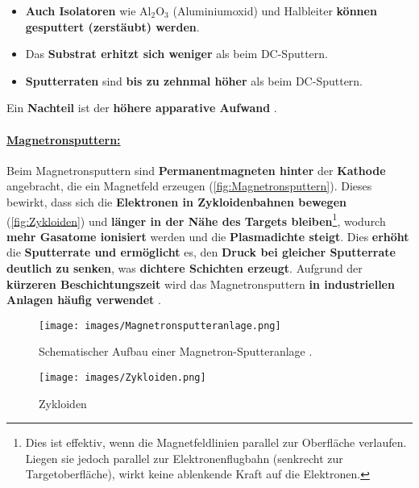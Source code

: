 \documentclass{article} %
\begin{document}
\begin{itemize}
    \item \textbf{Auch Isolatoren} wie \( \mathrm{Al}_2\mathrm{O}_3 \) (Aluminiumoxid) und Halbleiter \textbf{können gesputtert (zerstäubt) werden}.
    \item Das \textbf{Substrat erhitzt sich weniger} als beim DC-Sputtern.
    \item \textbf{Sputterraten} sind \textbf{bis zu zehnmal höher} als beim DC-Sputtern.
\end{itemize}

Ein \textbf{Nachteil} ist der \textbf{höhere apparative Aufwand} \cite{keplinger2024}.

\vspace{0.0em}

\paragraph{\uline{Magnetronsputtern:}} Beim Magnetronsputtern sind \textbf{Permanentmagneten hinter} der \textbf{Kathode} angebracht, die ein Magnetfeld erzeugen (\autoref{fig:Magnetronsputtern}). Dieses bewirkt, dass sich die \textbf{Elektronen in Zykloidenbahnen bewegen} (\autoref{fig:Zykloiden}) und \textbf{länger in der Nähe des Targets bleiben}\footnote{Dies ist effektiv, wenn die Magnetfeldlinien parallel zur Oberfläche verlaufen. Liegen sie jedoch parallel zur Elektronenflugbahn (senkrecht zur Targetoberfläche), wirkt keine ablenkende Kraft auf die Elektronen.}, wodurch \textbf{mehr Gasatome ionisiert} werden und die \textbf{Plasmadichte steigt}. Dies \textbf{erhöht} die \textbf{Sputterrate und ermöglicht} es, den \textbf{Druck bei gleicher Sputterrate deutlich zu senken}, was \textbf{dichtere Schichten erzeugt}. Aufgrund der \textbf{kürzeren Beschichtungszeit} wird das Magnetronsputtern \textbf{in industriellen Anlagen häufig verwendet} \cite{kittel2004}. \\

\begin{figure}[htb!]
    \centering
    \texttt{[image: images/Magnetronsputteranlage.png]} %
    \captionsetup{labelfont=bf} %
    \caption{Schematischer Aufbau einer Magnetron-Sputteranlage \cite{keplinger2024}.}
    \label{fig:Magnetronsputtern}
\end{figure}

\begin{figure}[htb!]
    \centering
    \texttt{[image: images/Zykloiden.png]} %
    \captionsetup{labelfont=bf} %
    \caption{Zykloiden \cite{hoegel2024}}
    \label{fig:Zykloiden}
\end{figure}
\end{document}

